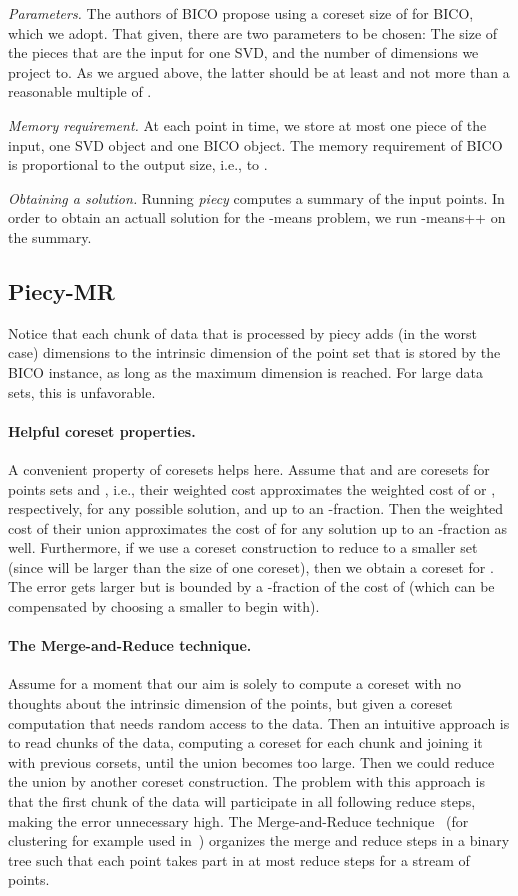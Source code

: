 \documentclass[a4paper]{scrartcl}
\makeatletter
\newcommand{\ie}{i.\nolinebreak[4]\hspace{0.125em}\nolinebreak[4]e.,\@\xspace}
\makeatother
\begin{document}
\emph{Parameters.} The authors of BICO propose using a coreset size of  for BICO, which we adopt. That given, there are two parameters to be chosen: The size of the pieces that are the input for one SVD, and the number of dimensions we project to. As we argued above, the latter should be at least  and not more than a reasonable multiple of .

\emph{Memory requirement.} At each point in time, we store at most one piece of the input, one SVD object and one BICO object. The memory requirement of BICO is proportional to the output size, \ie to .

\emph{Obtaining a solution.} Running \emph{piecy} computes a summary of the input points. In order to obtain an actuall solution for the -means problem, we run -means++\cite{AV07} on the summary.

\subsection{Piecy-MR}
Notice that each chunk of data that is processed by piecy adds (in the worst case)  dimensions to the intrinsic dimension of the point set that is stored by the BICO instance, as long as the maximum dimension is reached. For large data sets, this is unfavorable.

\paragraph*{Helpful coreset properties.}
A convenient property of coresets helps here. Assume that  and  are coresets for points sets  and , \ie their weighted cost approximates the weighted cost of  or , respectively, for any possible solution, and up to an -fraction. Then the weighted cost of their union  approximates the cost of  for any solution up to an -fraction as well. Furthermore, if we use a coreset construction to reduce  to a smaller set (since  will be larger than the size of one coreset), then we obtain a coreset for . The error gets larger but is bounded by a -fraction of the cost of  (which can be compensated by choosing a smaller  to begin with).

\paragraph*{The Merge-and-Reduce technique.}
Assume for a moment that our aim is solely to compute a coreset with no thoughts about the intrinsic dimension of the points, but given a coreset computation that needs random access to the data. Then an intuitive approach is to read chunks of the data, computing a coreset for each chunk and joining it with previous corsets, until the union becomes too large. Then we could reduce the union by another coreset construction. The problem with this approach is that the first chunk of the data will participate in all following reduce steps, making the error unnecessary high. The Merge-and-Reduce technique~\cite{BS80} (for clustering for example used in~\cite{AHPV04,HPM04}) organizes the merge and reduce steps in a binary tree such that each point takes part in at most  reduce steps for a stream of  points.
\end{document}
